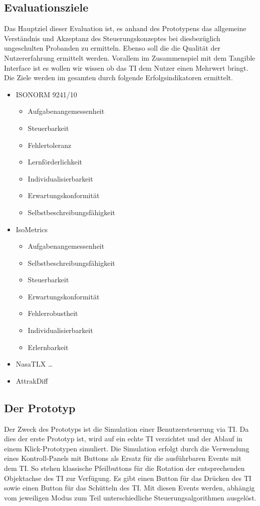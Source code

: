 \documentclass[runningheads,a4paper, 12pt]{llncs}
\begin{document}
\subsection{Evaluationsziele}
Das Hauptziel dieser Evaluation ist, es anhand des Prototypens das allgemeine Verständnis und Akzeptanz des Steuerungskonzeptes bei diesbezüglich ungeschulten Probanden zu ermitteln.
Ebenso soll die die Qualität der Nutzererfahrung ermittelt werden. Vorallem im Zusammenspiel mit dem Tangible Interface ist es wollen wir wissen ob das TI dem Nutzer einen Mehrwert bringt.
Die Ziele werden im gesamten durch folgende Erfolgsindikatoren ermittelt.
\begin{itemize}  
	\item ISONORM 9241/10
	 \begin{itemize}
	 	\item Aufgabenangemessenheit
	 	\item Steuerbarkeit
	 	\item Fehlertoleranz
	 	\item Lernförderlichkeit
	 	\item Individualisierbarkeit
	 	\item Erwartungskonformität
	 	\item Selbstbeschreibungsfähigkeit  
	 \end{itemize}
	\item IsoMetrics
	\begin{itemize}
		\item Aufgabenangemessenheit
		\item Selbstbeschreibungsfähigkeit
		\item Steuerbarkeit
		\item Erwartungskonformität
		\item Fehlerrobustheit
		\item Individualisierbarkeit
		\item Erlernbarkeit
	\end{itemize}
	\item NasaTLX \ldots 
	\item AttrakDiff 
\end{itemize}

\subsection{Der Prototyp}
Der Zweck des Prototyps ist die Simulation einer Benutzersteuerung via TI. Da dies der erste Prototyp ist, wird auf ein echte TI verzichtet und der Ablauf in einem Klick-Prototypen simuliert. Die Simulation erfolgt durch die Verwendung eines Kontroll-Panels mit Buttons als Ersatz für die ausführbaren Events mit dem TI. So stehen klassische Pfeilbuttons für die Rotation der entsprechenden Objektachse des TI zur Verfügung. Es gibt einen Button für das Drücken des TI sowie einen Button für das Schütteln des TI.
Mit diesen Events werden, abhängig vom jeweiligen Modus zum Teil unterschiedliche Steuerungsalgorithmen ausgelöst.
\end{document}
